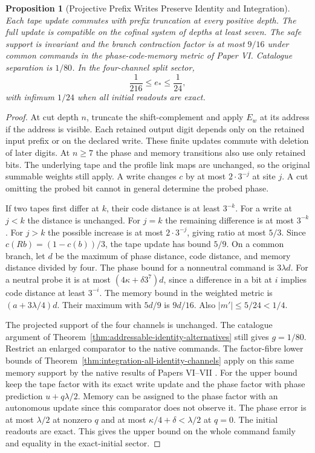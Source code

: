 \documentclass[11pt,a4paper]{article}
\newtheorem{proposition}[theorem]{Proposition}
\theoremstyle{definition}
\begin{document}
\begin{proposition}[Projective Prefix Writes Preserve Identity and Integration]\label{prop:writable-prefix-preservation}
Each tape update commutes with prefix truncation at every positive depth. The full update is compatible on the cofinal system of depths at least seven. The safe support is invariant and the branch contraction factor is at most $9/16$ under common commands in the phase-code-memory metric of Paper VI. Catalogue separation is $1/80$. In the four-channel split sector,
\[
 \frac{1}{216}\le e_\ast\le\frac{1}{24},
\]
with infimum $1/24$ when all initial readouts are exact.
\end{proposition}
\begin{proof}
At cut depth $n$, truncate the shift-complement and apply $E_w$ at its address if the address is visible. Each retained output digit depends only on the retained input prefix or on the declared write. These finite updates commute with deletion of later digits. At $n\ge7$ the phase and memory transitions also use only retained bits. The underlying tape and the profile link maps are unchanged, so the original summable weights still apply. A write changes $c$ by at most $2\cdot3^{-j}$ at site $j$. A cut omitting the probed bit cannot in general determine the probed phase.

If two tapes first differ at $k$, their code distance is at least $3^{-k}$. For a write at $j<k$ the distance is unchanged. For $j=k$ the remaining difference is at most $3^{-k}$. For $j>k$ the possible increase is at most $2\cdot3^{-j}$, giving ratio at most $5/3$. Since $c(Rb)=(1-c(b))/3$, the tape update has bound $5/9$. On a common branch, let $d$ be the maximum of phase distance, code distance, and memory distance divided by four. The phase bound for a nonneutral command is $3\lambda d$. For a neutral probe it is at most $(4\kappa+\delta 3^7)d$, since a difference in a bit at $i$ implies code distance at least $3^{-i}$. The memory bound in the weighted metric is $(a+3\lambda/4)d$. Their maximum with $5d/9$ is $9d/16$. Also $|m'|\le5/24<1/4$.

The projected support of the four channels is unchanged. The catalogue argument of Theorem~\ref{thm:addressable-identity-alternatives} still gives $g=1/80$. Restrict an enlarged comparator to the native commands. The factor-fibre lower bounds of Theorem~\ref{thm:integration-all-identity-channels} apply on this same memory support by the native results of Papers VI--VII \cite{paper6,paper7}. For the upper bound keep the tape factor with its exact write update and the phase factor with phase prediction $u+q\lambda/2$. Memory can be assigned to the phase factor with an autonomous update since this comparator does not observe it. The phase error is at most $\lambda/2$ at nonzero $q$ and at most $\kappa/4+\delta<\lambda/2$ at $q=0$. The initial readouts are exact. This gives the upper bound on the whole command family and equality in the exact-initial sector.
\end{proof}
\end{document}
